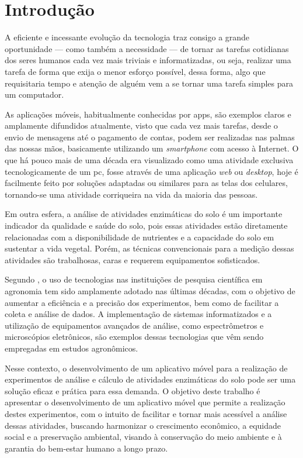 \chapter{Introdução}
\label{chp:introduction}
A eficiente e incessante evolução da tecnologia traz consigo a grande oportunidade — como também a necessidade — de tornar as tarefas cotidianas dos seres humanos cada vez mais triviais e informatizadas, ou seja, realizar uma tarefa de forma que exija o menor esforço possível, dessa forma, algo que requisitaria tempo e atenção de alguém vem a se tornar uma tarefa simples para um computador.

As aplicações móveis, habitualmente conhecidas por \acp{app}, são exemplos claros e amplamente difundidos atualmente, visto que cada vez mais tarefas, desde o envio de mensagens até o pagamento de contas, podem ser realizadas nas palmas das nossas mãos, basicamente utilizando um \textit{smartphone} com acesso à Internet. O que há pouco mais de uma década era visualizado como uma atividade exclusiva tecnologicamente de um \ac{pc}, fosse através de uma aplicação \textit{web} ou \textit{desktop}, hoje é facilmente feito por soluções adaptadas ou similares para as telas dos celulares, tornando-se uma atividade corriqueira na vida da maioria das pessoas.

Em outra esfera, a análise de atividades enzimáticas do solo é um importante indicador da qualidade e saúde do solo, pois essas atividades estão diretamente relacionadas com a disponibilidade de nutrientes e a capacidade do solo em sustentar a vida vegetal. Porém, as técnicas convencionais para a medição dessas atividades são trabalhosas, caras e requerem equipamentos sofisticados.

Segundo \cite{nascimento2017impacto}, o uso de tecnologias nas instituições de pesquisa científica em agronomia tem sido amplamente adotado nas últimas décadas, com o objetivo de aumentar a eficiência e a precisão dos experimentos, bem como de facilitar a coleta e análise de dados. A implementação de sistemas informatizados e a utilização de equipamentos avançados de análise, como espectrômetros e microscópios eletrônicos, são exemplos dessas tecnologias que vêm sendo empregadas em estudos agronômicos.

Nesse contexto, o desenvolvimento de um aplicativo móvel para a realização de experimentos de análise e cálculo de atividades enzimáticas do solo pode ser uma solução eficaz e prática para essa demanda. O objetivo deste trabalho é apresentar o desenvolvimento de um aplicativo móvel que permite a realização destes experimentos, com o intuito de facilitar e tornar mais acessível a análise dessas atividades, buscando harmonizar o crescimento econômico, a equidade social e a preservação ambiental, visando à conservação do meio ambiente e à garantia do bem-estar humano a longo prazo.

